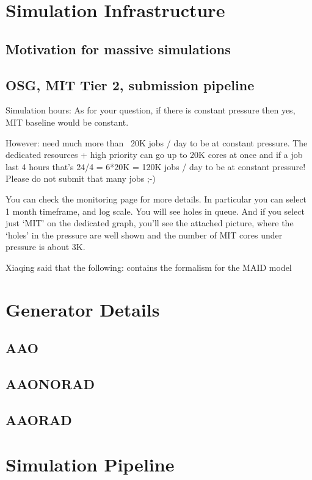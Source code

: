 \section{Simulation Infrastructure}\label{sec:ch3gemc}
    \subsection{Motivation for massive simulations}
    \subsection{OSG, MIT Tier 2, submission pipeline}

    Simulation hours: 
    As for your question, if there is constant pressure then yes, MIT baseline would be constant.

However: need much more than ~20K jobs / day to be at constant pressure. The dedicated resources + high priority can go up to 20K cores at once and if a job last 4 hours that’s 24/4 = 6*20K = 120K jobs / day to be at constant pressure! Please do not submit that many jobs ;-)

You can check the monitoring page for more details. In particular you can select 1 month timeframe, and log scale. You will see holes in queue.
And if you select just ‘MIT’ on the dedicated graph, you’ll see the attached picture, where the ‘holes’ in the pressure are well shown and the number of MIT cores under pressure is about 3K.

Xiaqing said that the following: \cite{Dreschsel1992ThresholdNucleons} contains the formalism for the MAID model


\section{Generator Details}\label{sec:ch3generator}
    \subsection{AAO}
        \subsection{AAONORAD}
        \subsection{AAORAD}

\section{Simulation Pipeline}
